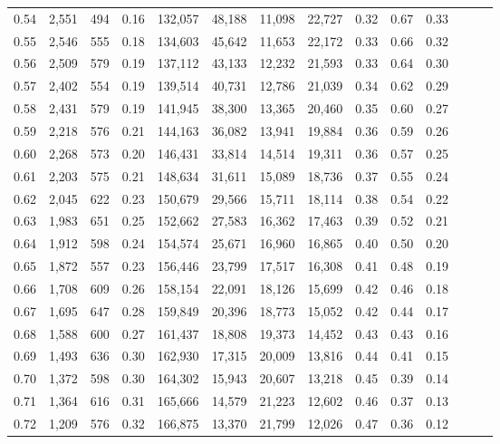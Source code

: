 \begin{tabular}{rrrrrrrrrrrrrr}
0.54 &  2,551 &  494 &  0.16 &  132,057 &   48,188 &  11,098 &  22,727 &  0.32 &  0.67 &      0.33 \\
0.55 &  2,546 &  555 &  0.18 &  134,603 &   45,642 &  11,653 &  22,172 &  0.33 &  0.66 &      0.32 \\
0.56 &  2,509 &  579 &  0.19 &  137,112 &   43,133 &  12,232 &  21,593 &  0.33 &  0.64 &      0.30 \\
0.57 &  2,402 &  554 &  0.19 &  139,514 &   40,731 &  12,786 &  21,039 &  0.34 &  0.62 &      0.29 \\
0.58 &  2,431 &  579 &  0.19 &  141,945 &   38,300 &  13,365 &  20,460 &  0.35 &  0.60 &      0.27 \\
0.59 &  2,218 &  576 &  0.21 &  144,163 &   36,082 &  13,941 &  19,884 &  0.36 &  0.59 &      0.26 \\
0.60 &  2,268 &  573 &  0.20 &  146,431 &   33,814 &  14,514 &  19,311 &  0.36 &  0.57 &      0.25 \\
0.61 &  2,203 &  575 &  0.21 &  148,634 &   31,611 &  15,089 &  18,736 &  0.37 &  0.55 &      0.24 \\
0.62 &  2,045 &  622 &  0.23 &  150,679 &   29,566 &  15,711 &  18,114 &  0.38 &  0.54 &      0.22 \\
0.63 &  1,983 &  651 &  0.25 &  152,662 &   27,583 &  16,362 &  17,463 &  0.39 &  0.52 &      0.21 \\
0.64 &  1,912 &  598 &  0.24 &  154,574 &   25,671 &  16,960 &  16,865 &  0.40 &  0.50 &      0.20 \\
0.65 &  1,872 &  557 &  0.23 &  156,446 &   23,799 &  17,517 &  16,308 &  0.41 &  0.48 &      0.19 \\
0.66 &  1,708 &  609 &  0.26 &  158,154 &   22,091 &  18,126 &  15,699 &  0.42 &  0.46 &      0.18 \\
0.67 &  1,695 &  647 &  0.28 &  159,849 &   20,396 &  18,773 &  15,052 &  0.42 &  0.44 &      0.17 \\
0.68 &  1,588 &  600 &  0.27 &  161,437 &   18,808 &  19,373 &  14,452 &  0.43 &  0.43 &      0.16 \\
0.69 &  1,493 &  636 &  0.30 &  162,930 &   17,315 &  20,009 &  13,816 &  0.44 &  0.41 &      0.15 \\
0.70 &  1,372 &  598 &  0.30 &  164,302 &   15,943 &  20,607 &  13,218 &  0.45 &  0.39 &      0.14 \\
0.71 &  1,364 &  616 &  0.31 &  165,666 &   14,579 &  21,223 &  12,602 &  0.46 &  0.37 &      0.13 \\
0.72 &  1,209 &  576 &  0.32 &  166,875 &   13,370 &  21,799 &  12,026 &  0.47 &  0.36 &      0.12 \\

\end{tabular}
